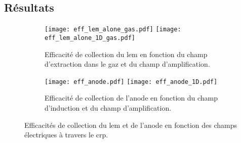             
    \subsection{Résultats}

      \begin{figure}[!htb]
        \begin{subfigure}{\textwidth}
          \centering
          \texttt{[image: eff\_lem\_alone\_gas.pdf]}\hfill
          \texttt{[image: eff\_lem\_alone\_1D\_gas.pdf]}
          \caption{\label{fig::eff_lem_alone}Efficacité de collection du \gls{lem} en fonction du champ d'extraction dans le gaz et du champ d'amplification.}
        \end{subfigure}\hfill
        \begin{subfigure}{\textwidth}
          \centering
          \texttt{[image: eff\_anode.pdf]}\hfill
          \texttt{[image: eff\_anode\_1D.pdf]}
          \caption{\label{fig::eff_anode}Efficacité de collection de l'anode en fonction du champ d'induction et du champ d'amplification.}
        \end{subfigure}
        \caption[Efficacités de collection du LEM et de l'anode en fonction des champs électriques à travers le CRP]{\label{fig::eff_coll}Efficacités de collection du \gls{lem} et de l'anode en fonction des champs électriques à travers le \gls{crp}.}
      \end{figure}

